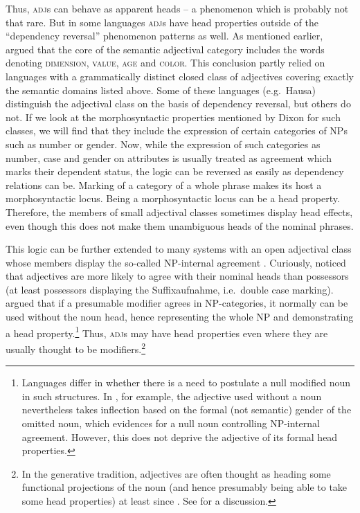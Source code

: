 \documentclass[output=paper,nobabel,draftmode  ,colorlinks, citecolor=brown]{langscibook}
\begin{document}
\noindent
Thus, \textsc{adj}s can behave as apparent heads – a phenomenon which is probably not that rare. But in some languages \textsc{adj}s have head properties outside of the ``dependency reversal'' phenomenon patterns as well. As mentioned earlier, \citet{Dixon1979} argued that the core of the semantic adjectival category includes the words denoting \textsc{dimension}, \textsc{value}, \textsc{age} and \textsc{color}. This conclusion partly relied on languages with a grammatically distinct closed class of adjectives covering exactly the semantic domains listed above. Some of these languages (e.g.\ Hausa) distinguish the adjectival class on the basis of dependency reversal, but others do not. If we look at the morphosyntactic properties mentioned by Dixon for such classes, we will find that they include the expression of certain categories of NPs such as number or gender. Now, while the expression of such categories as number, case and gender on attributes is usually treated as agreement which marks their dependent status, the logic can be reversed as easily as dependency relations can be. Marking of a category of a whole phrase makes its host a morphosyntactic locus. Being a morphosyntactic locus can be a head property. Therefore, the members of small adjectival classes sometimes display head effects, even though this does not make them unambiguous heads of the nominal phrases.

\largerpage[-1]
This logic can be further extended to many systems with an open adjectival class whose members display the so-called NP-internal agreement \citep[cf.][21--23 for ]{Corbett93a}. Curiously, \citet{Moravcsik1995} noticed that adjectives are more likely to agree with their nominal heads than possessors (at least possessors displaying the Suffixaufnahme, i.e.\ double case marking). \citet{Lander2010} argued that if a presumable modifier agrees in NP-categories, it normally can be used without the noun head, hence representing the whole NP and demonstrating a head property.\footnote{Languages differ in whether there is a need to postulate a null modified noun in such structures. In , for example, the adjective used without a noun nevertheless takes inflection based on the formal (not semantic) gender of the omitted noun, which evidences for a null noun controlling NP-internal agreement. However, this does not deprive the adjective of its formal head properties.}
Thus, \textsc{adj}s may have head properties even where they are usually thought to be modifiers.\footnote{In the generative tradition, adjectives are often thought as heading some functional projections of the noun (and hence presumably being able to take some head properties) at least since \citet{Abney87a}. See \citet{Cinque2010} for a  discussion.} 
\end{document}
